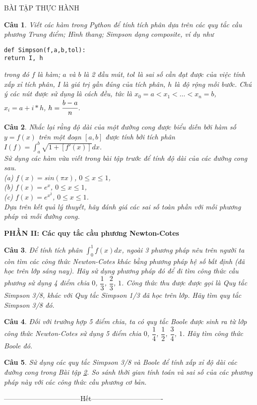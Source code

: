 \documentclass[11pt]{article}
\newtheorem{bt}{Câu}
\begin{document}
\begin{center}
	BÀI TẬP THỰC HÀNH \\
\end{center}

\begin{bt} Viết các hàm trong Python để tính tích phân dựa trên các quy tắc cầu phương Trung điểm; Hình thang; Simpson dạng composite, ví dụ như
%
\begin{lstlisting}[frame=single] 
def Simpson(f,a,b,tol):
return I, h
\end{lstlisting}
%	 
trong đó $f$ là hàm; $a$ và $b$ là 2 đầu mút, $tol$ là sai số cần đạt được của việc tính xấp xỉ tích phân, $I$ là giá trị gần đúng của tích phân, $h$ là độ rộng mỗi bước. Chú ý các nút được sử dụng là cách đều, tức là $x_0=a<x_1<\dots<x_n=b$, $x_i = a+i*h$, $h=\cfrac{b-a}{n}$. 
\end{bt}

\begin{bt}\label{bt5}
	Nhắc lại rằng độ dài của một đường cong được biểu diễn bởi hàm số $y=f(x)$ trên một đoạn $[a,b]$ được tính bởi tích phân $I(f) = \int_{a}^{b} \sqrt{1+[f'(x)]} dx$.\\ 
	Sử dụng các hàm vừa viết trong bài tập trước để tính độ dài của các đường cong sau. \\ 
	(a) $f(x)=sin(\pi x)$, $0\leq x \leq 1$, \\ 
	(b) $f(x)=e^x$, $0\leq x \leq 1$, \\ 
	(c) $f(x)=e^{x^2}$, $0\leq x \leq 1$.\\
	Dựa trên kết quả lý thuyết, hãy đánh giá các sai số toàn phần với mỗi phương pháp và mỗi đường cong.  	
\end{bt}

\begin{center}	
	\textbf{PHẦN II: Các quy tắc cầu phương Newton-Cotes}
\end{center}

\begin{bt}
Để tính tích phân $\int_{0}^{1} f(x)dx$, ngoài 3 phương pháp nêu trên người ta còn tìm các công thức Newton-Cotes khác bằng phương pháp hệ số bất định (đã học trên lớp sáng nay). Hãy sử dụng phương pháp đó để đi tìm công thức cầu phương sử dụng 4 điểm chia $0$, $\dfrac{1}{3}$, $\dfrac{2}{3}$, $1$. Công thức thu được được gọi là \emph{Quy tắc Simpson 3/8}, khác với \emph{Quy tắc Simpson 1/3} đã học trên lớp. Hãy tìm quy tắc Simpson 3/8 đó.
\end{bt}


\begin{bt}
Đối với trường hợp 5 điểm chia, ta có quy tắc Boole được sinh ra từ lớp công thức Newton-Cotes sử dụng 5 điểm chia $0$, $\dfrac{1}{4}$, $\dfrac{1}{2}$, $\dfrac{3}{4}$, $1$. Hãy tìm công thức Boole đó.
\end{bt}

\begin{bt}
Sử dụng các quy tắc Simpson 3/8 và Boole để tính xấp xỉ độ dài các đường cong trong Bài tập \ref{bt5}. So sánh thời gian tính toán và sai số của các phương pháp này với các công thức cầu phương cơ bản.
\end{bt}
\centerline{———————————Hết——————————-}
\end{document}
